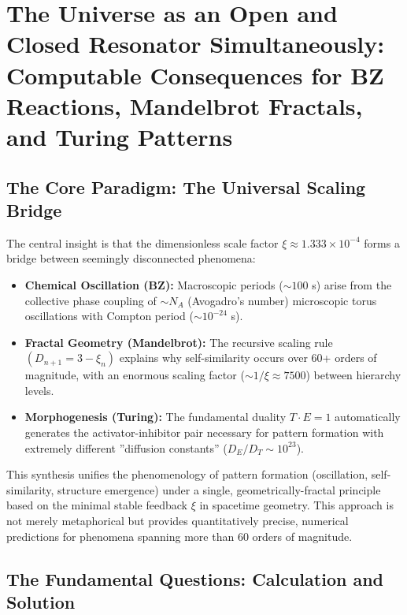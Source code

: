 \chapter{The Universe as an Open and Closed Resonator Simultaneously: \\
	Computable Consequences for BZ Reactions, Mandelbrot Fractals, and Turing Patterns}

	

	
	\section*{The Core Paradigm: The Universal Scaling Bridge}
	
	The central insight is that the dimensionless scale factor $\xi \approx 1.333 \times 10^{-4}$ forms a bridge between seemingly disconnected phenomena:
	
	\begin{itemize}[label=$\bullet$]
		\item \textbf{Chemical Oscillation (BZ):} Macroscopic periods ($\sim 100$ s) arise from the collective phase coupling of $\sim N_A$ (Avogadro's number) microscopic torus oscillations with Compton period ($\sim 10^{-24}$ s).
		
		\item \textbf{Fractal Geometry (Mandelbrot):} The recursive scaling rule $(D_{n+1} = 3 - \xi_n)$ explains why self-similarity occurs over 60+ orders of magnitude, with an enormous scaling factor ($\sim 1/\xi \approx 7500$) between hierarchy levels.
		
		\item \textbf{Morphogenesis (Turing):} The fundamental duality $T \cdot E = 1$ automatically generates the activator-inhibitor pair necessary for pattern formation with extremely different ''diffusion constants'' ($D_E/D_T \sim 10^{23}$).
	\end{itemize}
	
	This synthesis unifies the phenomenology of pattern formation (oscillation, self-similarity, structure emergence) under a single, geometrically-fractal principle based on the minimal stable feedback $\xi$ in spacetime geometry. This approach is not merely metaphorical but provides quantitatively precise, numerical predictions for phenomena spanning more than 60 orders of magnitude.
	
	\section*{The Fundamental Questions: Calculation and Solution}
	
